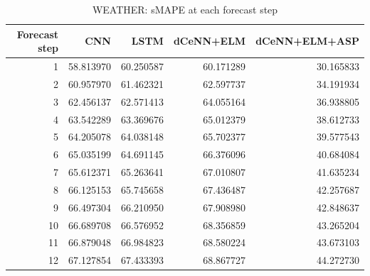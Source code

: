 \begin{table}
\caption{WEATHER: sMAPE at each forecast step}
\begin{tabular}{rrrrr}
\toprule
Forecast step & CNN & LSTM & dCeNN+ELM & dCeNN+ELM+ASP \\
\midrule
1 & 58.813970 & 60.250587 & 60.171289 & 30.165833 \\
2 & 60.957970 & 61.462321 & 62.597737 & 34.191934 \\
3 & 62.456137 & 62.571413 & 64.055164 & 36.938805 \\
4 & 63.542289 & 63.369676 & 65.012379 & 38.612733 \\
5 & 64.205078 & 64.038148 & 65.702377 & 39.577543 \\
6 & 65.035199 & 64.691145 & 66.376096 & 40.684084 \\
7 & 65.612371 & 65.263641 & 67.010807 & 41.635234 \\
8 & 66.125153 & 65.745658 & 67.436487 & 42.257687 \\
9 & 66.497304 & 66.210950 & 67.908980 & 42.848637 \\
10 & 66.689708 & 66.576952 & 68.356859 & 43.265204 \\
11 & 66.879048 & 66.984823 & 68.580224 & 43.673103 \\
12 & 67.127854 & 67.433393 & 68.867727 & 44.272730 \\
\bottomrule
\end{tabular}
\end{table}

